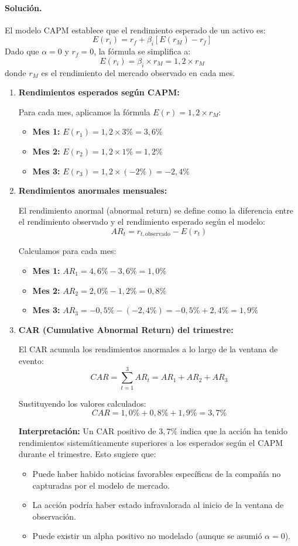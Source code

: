 \documentclass[12pt,a4paper]{article}
\newenvironment{solucion}{\paragraph{Solución.}}{}
\begin{document}
\begin{solucion}
El modelo CAPM establece que el rendimiento esperado de un activo es:
\[
E(r_i) = r_f + \beta_i [E(r_M) - r_f]
\]
Dado que \(\alpha=0\) y \(r_f=0\), la fórmula se simplifica a:
\[
E(r_i) = \beta_i \times r_M = 1{,}2 \times r_M
\]
donde \(r_M\) es el rendimiento del mercado observado en cada mes.

\begin{enumerate}[label=\alph*)]
  \item \textbf{Rendimientos esperados según CAPM:}
  
  Para cada mes, aplicamos la fórmula \(E(r) = 1{,}2 \times r_M\):
  \begin{itemize}
    \item \textbf{Mes 1:} \(E(r_1) = 1{,}2 \times 3\% = 3{,}6\%\)
    \item \textbf{Mes 2:} \(E(r_2) = 1{,}2 \times 1\% = 1{,}2\%\)
    \item \textbf{Mes 3:} \(E(r_3) = 1{,}2 \times (-2\%) = -2{,}4\%\)
  \end{itemize}
  
  \item \textbf{Rendimientos anormales mensuales:}
  
  El rendimiento anormal (abnormal return) se define como la diferencia entre el rendimiento observado y el rendimiento esperado según el modelo:
  \[
  AR_t = r_{t,\text{observado}} - E(r_t)
  \]
  
  Calculamos para cada mes:
  \begin{itemize}
    \item \textbf{Mes 1:} \(AR_1 = 4{,}6\% - 3{,}6\% = 1{,}0\%\)
    \item \textbf{Mes 2:} \(AR_2 = 2{,}0\% - 1{,}2\% = 0{,}8\%\)
    \item \textbf{Mes 3:} \(AR_3 = -0{,}5\% - (-2{,}4\%) = -0{,}5\% + 2{,}4\% = 1{,}9\%\)
  \end{itemize}
  
  \item \textbf{CAR (Cumulative Abnormal Return) del trimestre:}
  
  El CAR acumula los rendimientos anormales a lo largo de la ventana de evento:
  \[
  CAR = \sum_{t=1}^{3} AR_t = AR_1 + AR_2 + AR_3
  \]
  
  Sustituyendo los valores calculados:
  \[
  CAR = 1{,}0\% + 0{,}8\% + 1{,}9\% = 3{,}7\%
  \]
  
  \textbf{Interpretación:} Un CAR positivo de \(3{,}7\%\) indica que la acción ha tenido rendimientos sistemáticamente superiores a los esperados según el CAPM durante el trimestre. Esto sugiere que:
  \begin{itemize}
    \item Puede haber habido noticias favorables específicas de la compañía no capturadas por el modelo de mercado.
    \item La acción podría haber estado infravalorada al inicio de la ventana de observación.
    \item Puede existir un alpha positivo no modelado (aunque se asumió \(\alpha=0\)).
  \end{itemize}
\end{enumerate}
\end{solucion}
\end{document}
